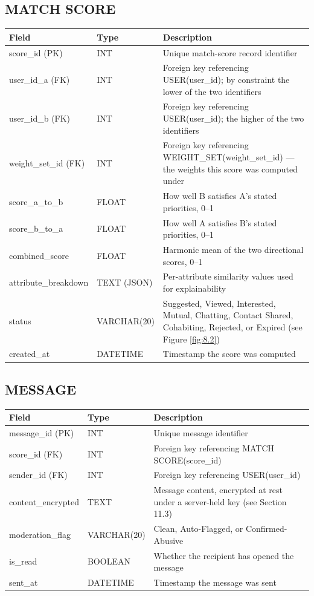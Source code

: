 \documentclass[12pt,a4paper]{report}
\begin{document}
\subsection*{MATCH SCORE}
\begin{longtable}{L{3.2cm}L{2.5cm}L{8.5cm}}
\toprule
\textbf{Field} & \textbf{Type} & \textbf{Description} \\
\midrule
\endhead
score\_id (PK) & INT & Unique match-score record identifier \\
user\_id\_a (FK) & INT & Foreign key referencing USER(user\_id); by constraint the lower of the two identifiers \\
user\_id\_b (FK) & INT & Foreign key referencing USER(user\_id); the higher of the two identifiers \\
weight\_set\_id (FK) & INT & Foreign key referencing WEIGHT\_SET(weight\_set\_id) --- the weights this score was computed under \\
score\_a\_to\_b & FLOAT & How well B satisfies A's stated priorities, 0--1 \\
score\_b\_to\_a & FLOAT & How well A satisfies B's stated priorities, 0--1 \\
combined\_score & FLOAT & Harmonic mean of the two directional scores, 0--1 \\
attribute\_breakdown & TEXT (JSON) & Per-attribute similarity values used for explainability \\
status & VARCHAR(20) & Suggested, Viewed, Interested, Mutual, Chatting, Contact Shared, Cohabiting, Rejected, or Expired (see Figure \ref{fig:8.2}) \\
created\_at & DATETIME & Timestamp the score was computed \\
\bottomrule
\end{longtable}

\subsection*{MESSAGE}
\begin{longtable}{L{3.2cm}L{2.5cm}L{8.5cm}}
\toprule
\textbf{Field} & \textbf{Type} & \textbf{Description} \\
\midrule
\endhead
message\_id (PK) & INT & Unique message identifier \\
score\_id (FK) & INT & Foreign key referencing MATCH SCORE(score\_id) \\
sender\_id (FK) & INT & Foreign key referencing USER(user\_id) \\
content\_encrypted & TEXT & Message content, encrypted at rest under a server-held key (see Section 11.3) \\
moderation\_flag & VARCHAR(20) & Clean, Auto-Flagged, or Confirmed-Abusive \\
is\_read & BOOLEAN & Whether the recipient has opened the message \\
sent\_at & DATETIME & Timestamp the message was sent \\
\bottomrule
\end{longtable}
\end{document}
